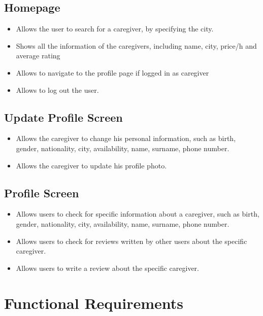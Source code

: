 \documentclass[../../dd.tex]{subfiles}
\begin{document}
    \subsection{Homepage}
    \begin{itemize}
        \item Allows the user to search for a caregiver, by specifying the city.
        \item Shows all the information of the caregivers, including name, city, price/h and average rating
        \item Allows to navigate to the profile page if logged in as caregiver
        \item Allows to log out the user.
    \end{itemize}

    \subsection{Update Profile Screen}
    \begin{itemize}
        \item Allows the caregiver to change his personal information, such as birth, gender, nationality,
        city, availability, name, surname, phone number.
        \item Allows the caregiver to update his profile photo.
    \end{itemize}

    \subsection{Profile Screen}
    \begin{itemize}
        \item Allows users to check for specific information about a caregiver, such as birth, gender, nationality,
        city, availability, name, surname, phone number.
        \item Allows users to check for reviews written by other users about the specific caregiver.
        \item Allows users to write a review about the specific caregiver.
    \end{itemize}

    \section{Functional Requirements}
\end{document}
